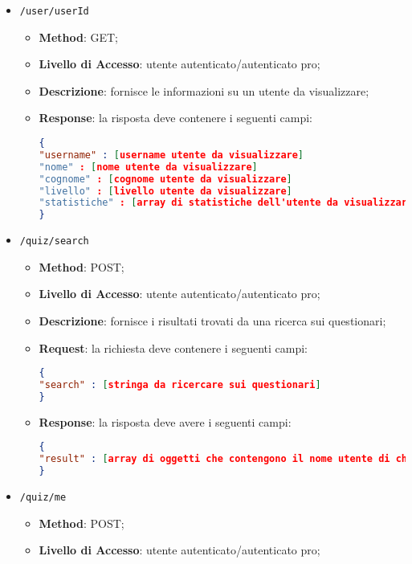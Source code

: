 \begin{itemize}
\begin{itemize}
\begin{lstlisting}[language=json,firstnumber=1]
}
\end{lstlisting}
		\end{itemize}
	\item \texttt{/user/userId}
		\begin{itemize}
			\item \textbf{Method}: GET;
			\item \textbf{Livello di Accesso}: utente autenticato/autenticato pro;
			\item \textbf{Descrizione}: fornisce le informazioni su un utente da visualizzare;
			\item \textbf{Response}: la risposta deve contenere i seguenti campi:
\begin{lstlisting}[language=json,firstnumber=1]
{
"username" : [username utente da visualizzare]
"nome" : [nome utente da visualizzare]
"cognome" : [cognome utente da visualizzare]
"livello" : [livello utente da visualizzare]
"statistiche" : [array di statistiche dell'utente da visualizzare]
}
\end{lstlisting}
		\end{itemize}
	\item \texttt{/quiz/search}
		\begin{itemize}
			\item \textbf{Method}: POST;
			\item \textbf{Livello di Accesso}: utente autenticato/autenticato pro;
			\item \textbf{Descrizione}: fornisce i risultati trovati da una ricerca sui questionari;
			\item \textbf{Request}: la richiesta deve contenere i seguenti campi:
\begin{lstlisting}[language=json,firstnumber=1]
{
"search" : [stringa da ricercare sui questionari]
}
\end{lstlisting}
			\item \textbf{Response}: la risposta deve avere i seguenti campi:
\begin{lstlisting}[language=json,firstnumber=1]
{
"result" : [array di oggetti che contengono il nome utente di chi ha creato il questionario, il nome del questionarioe il suo identificativo]
}
\end{lstlisting} 
		\end{itemize}
	\item \texttt{/quiz/me}
		\begin{itemize}
			\item \textbf{Method}: POST;
			\item \textbf{Livello di Accesso}: utente autenticato/autenticato pro;

\end{itemize}
\end{itemize}
